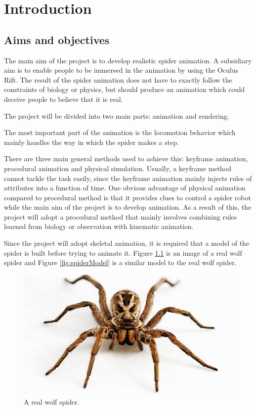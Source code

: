 
\chapter{Introduction}
\section{Aims and objectives}
The main aim of the project is to develop realistic spider animation.
A subsidiary aim is to enable people to be immersed in the animation by using the Oculus Rift. 
The result of the spider animation does not have to exactly follow the constraints of biology or physics, 
but should produce an animation which could deceive people to believe that it is real. 

The project will be divided into two main parts: animation and rendering. 

The most important part of the animation is the locomotion behavior which mainly handles 
the way in which the spider makes a step. 

There are three main general methods used to achieve this: keyframe animation, procedural animation and physical simulation. Usually, a keyframe method cannot tackle the task easily, since the keyframe animation mainly injects rules of attributes into a function of time.  One obvious advantage of physical animation compared to procedural method is that it provides clues to control a spider robot while the main aim of the project is to develop animation. As a result of this, the project will adopt a procedural method that mainly involves combining rules learned from biology or observation with kinematic animation.  

Since the project will adopt skeletal animation, it is required that a model of the spider is built before trying to animate it. Figure  \ref{fig:realSpider} is an image of a real wolf spider and Figure \ref{fig:spiderModel} is a similar model to the real wolf spider.


\begin{figure}[ht!]
\centering
\includegraphics[width=14cm]{figures/realSpider.png}
\caption{A real wolf spider. \protect\footnotemark}
\label{fig:realSpider}
\end{figure}


